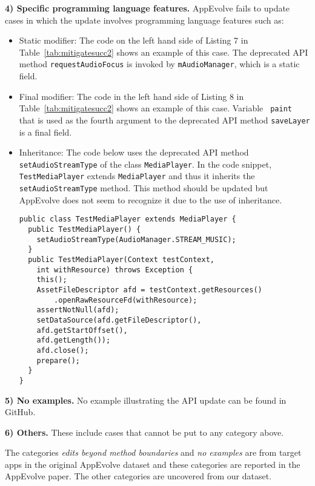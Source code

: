 \vspace{0.25\baselineskip}\noindent\textbf{4) Specific programming language features.} AppEvolve fails to update cases in which the update involves programming language features such as:
\begin{itemize}
\item Static modifier:  The code on the left hand side of Listing 7 in
Table~\ref{tab:mitigatesucc2} shows an example of this case.  The deprecated
API method {\tt requestAudioFocus} is invoked by {\tt mAudioManager}, which
is a static field.

\item Final modifier: The code in the left hand side of Listing 8 in
Table~\ref{tab:mitigatesucc2} shows an example of this case.  Variable {\tt
paint} that is used as the fourth argument to the deprecated API method
{\tt saveLayer} is a final field.

\item Inheritance: The code below uses the deprecated API method {\tt
	set\-Audio\-Stream\-Type} of the class {\tt MediaPlayer}. In the code snippet,
{\tt Test\-Media\-Player} extends {\tt MediaPlayer} and thus it inherits
the {\tt setAudioStreamType} method. This method should be updated but
AppEvolve does not seem to recognize it due to the use of inheritance.
\begin{lstlisting}[language=text]
public class TestMediaPlayer extends MediaPlayer {
  public TestMediaPlayer() {
    setAudioStreamType(AudioManager.STREAM_MUSIC);
  }
  public TestMediaPlayer(Context testContext,
    int withResource) throws Exception {
    this();
    AssetFileDescriptor afd = testContext.getResources()
        .openRawResourceFd(withResource);
    assertNotNull(afd);
	setDataSource(afd.getFileDescriptor(),
	afd.getStartOffset(),
	afd.getLength());
	afd.close();
	prepare();
  }
}
\end{lstlisting}

\end{itemize}

\vspace{0.25\baselineskip}\noindent\textbf{5) No examples.} No example
illustrating the API update can be found in GitHub.

\vspace{0.25\baselineskip}\noindent\textbf{6) Others.} These include cases that cannot be put to any category above.

\vspace{0.25\baselineskip}\noindent The categories {\em edits
beyond method boundaries} and {\em no examples} are from target apps in the
original AppEvolve dataset and these categories are reported in the
AppEvolve paper. The other categories are uncovered from our dataset.

